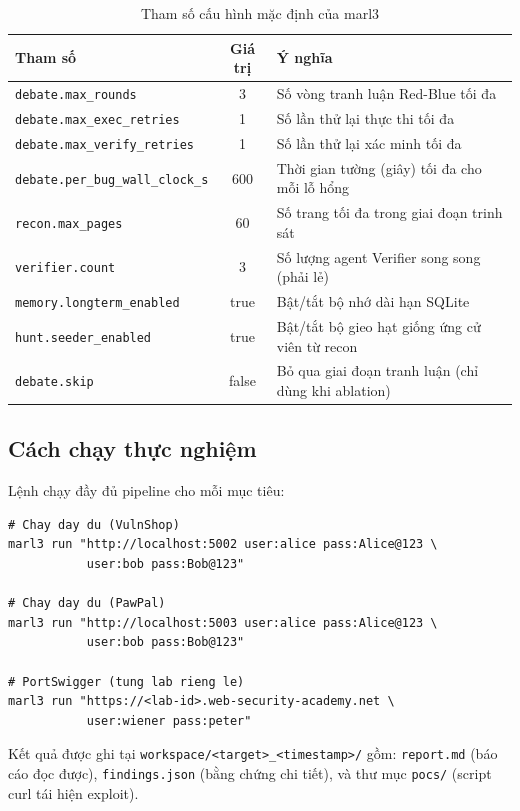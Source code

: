 \begin{table}[h]
\centering
\renewcommand{\arraystretch}{1.3}
\caption{Tham số cấu hình mặc định của marl3}
\label{tab:config}
\begin{tabular}{|l|c|p{6cm}|}
\hline
\textbf{Tham số} & \textbf{Giá trị} & \textbf{Ý nghĩa} \\
\hline
\texttt{debate.max\_rounds} & 3 & Số vòng tranh luận Red-Blue tối đa \\
\hline
\texttt{debate.max\_exec\_retries} & 1 & Số lần thử lại thực thi tối đa \\
\hline
\texttt{debate.max\_verify\_retries} & 1 & Số lần thử lại xác minh tối đa \\
\hline
\texttt{debate.per\_bug\_wall\_clock\_s} & 600 & Thời gian tường (giây) tối đa cho mỗi lỗ hổng \\
\hline
\texttt{recon.max\_pages} & 60 & Số trang tối đa trong giai đoạn trinh sát \\
\hline
\texttt{verifier.count} & 3 & Số lượng agent Verifier song song (phải lẻ) \\
\hline
\texttt{memory.longterm\_enabled} & true & Bật/tắt bộ nhớ dài hạn SQLite \\
\hline
\texttt{hunt.seeder\_enabled} & true & Bật/tắt bộ gieo hạt giống ứng cử viên từ recon \\
\hline
\texttt{debate.skip} & false & Bỏ qua giai đoạn tranh luận (chỉ dùng khi ablation) \\
\hline
\end{tabular}
\end{table}

\subsection{Cách chạy thực nghiệm}

Lệnh chạy đầy đủ pipeline cho mỗi mục tiêu:

\begin{verbatim}
# Chay day du (VulnShop)
marl3 run "http://localhost:5002 user:alice pass:Alice@123 \
           user:bob pass:Bob@123"

# Chay day du (PawPal)
marl3 run "http://localhost:5003 user:alice pass:Alice@123 \
           user:bob pass:Bob@123"

# PortSwigger (tung lab rieng le)
marl3 run "https://<lab-id>.web-security-academy.net \
           user:wiener pass:peter"
\end{verbatim}

Kết quả được ghi tại \texttt{workspace/<target>\_<timestamp>/} gồm: \texttt{report.md} (báo cáo đọc được), \texttt{findings.json} (bằng chứng chi tiết), và thư mục \texttt{pocs/} (script curl tái hiện exploit).

